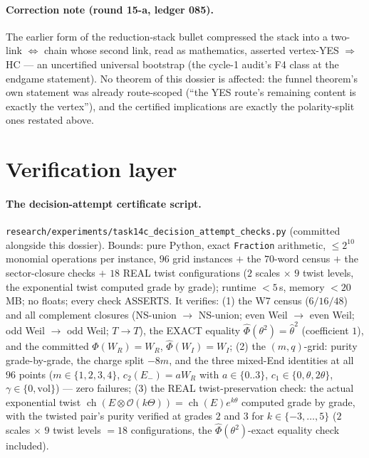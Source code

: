 \documentclass[11pt]{article}
\theoremstyle{definition}
\newcommand{\ch}{\operatorname{ch}}
\newcommand{\vol}{\mathrm{vol}}
\newcommand{\FMc}{\widehat\Phi}
\begin{document}
\paragraph{Correction note (round 15-a, ledger 085).}
The earlier form of the reduction-stack bullet compressed the stack
into a two-link $\iff$ chain whose second link, read as mathematics,
asserted vertex-YES $\Rightarrow$ HC --- an uncertified universal
bootstrap (the cycle-1 audit's F4 class at the endgame statement). No
theorem of this dossier is affected: the funnel theorem's own
statement was already route-scoped (``the YES route's remaining
content is exactly the vertex''), and the certified implications are
exactly the polarity-split ones restated above.

\section{Verification layer}\label{sec:verif}

\paragraph{The decision-attempt certificate script.}
\texttt{research/experiments/task14c\_decision\_attempt\_checks.py} (committed
alongside this dossier). Bounds: pure Python, exact \texttt{Fraction}
arithmetic, $\le 2^{10}$ monomial operations per instance, $96$ grid
instances $+$ the $70$-word census $+$ the sector-closure checks $+$ $18$
REAL twist configurations ($2$ scales $\times$ $9$ twist levels, the
exponential twist computed grade by grade); runtime $<5$\,s, memory
$<20$\,MB; no floats; every check ASSERTS. It
verifies: (1) the W7 census ($6/16/48$) and all complement closures
(NS-union $\to$ NS-union; even Weil $\to$ even Weil; odd Weil $\to$ odd Weil;
$T\to T$), the EXACT equality $\FMc(\theta^2)=\widehat\theta^2$ (coefficient
$1$), and the committed
$\FMc(W_R)=W_R$, $\FMc(W_I)=W_I$; (2) the $(m,q)$-grid: purity
grade-by-grade, the charge split $-8m$, and the three mixed-End identities at
all $96$ points ($m\in\{1,2,3,4\}$, $c_2(E_-)=aW_R$ with $a\in\{0..3\}$,
$c_1\in\{0,\theta,2\theta\}$, $\gamma\in\{0,\vol\}$) --- zero failures;
(3) the REAL twist-preservation check: the actual exponential twist
$\ch(E\otimes\mathcal O(k\Theta))=\ch(E)e^{k\theta}$ computed grade by grade,
with the twisted pair's purity verified at grades $2$ and $3$ for
$k\in\{-3,\dots,5\}$ ($2$ scales $\times$ $9$ twist levels $=18$
configurations, the $\FMc(\theta^2)$-exact equality check included).
\end{document}
